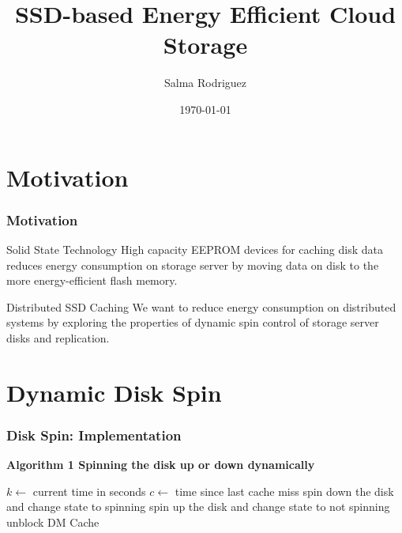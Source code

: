 \documentclass{beamer}
\title[Florida International University]{SSD-based Energy Efficient Cloud Storage}
\author{Salma Rodriguez}
\institute[University] {
Florida International University \\
\medskip
{\emph{srodr063@fiu.edu}}}
\date{\today}
\begin{document}
%
\begin{frame}
\titlepage
\end{frame}
%
\section{Motivation}
\begin{frame}
\frametitle{Motivation}
\begin{block}
{Solid State Technology}
High capacity EEPROM devices for caching disk data
reduces energy consumption on storage server by moving
data on disk to the more energy-efficient flash memory.
\end{block}
\begin{block}
{Distributed SSD Caching}
We want to reduce energy consumption on distributed systems by
exploring the properties of dynamic spin control of storage
server disks and replication.
\end{block}
\end{frame}
%
\section{Dynamic Disk Spin}
\begin{frame}
\frametitle{Disk Spin: Implementation}
\bf Algorithm 1 \rm Spinning the disk up or down dynamically
\begin{algorithmic}[1]
  \State $k\gets$ current time in seconds
  \State $c\gets$ time since last cache miss
   \State spin down the disk and change state to spinning
  \EndIf
 \Else {}
   \State spin up the disk and change state to not spinning
   \State unblock DM Cache
  \EndIf
 \EndIf
\EndWhile
\EndProcedure
\end{algorithmic}
\end{frame}
%
\end{document}

